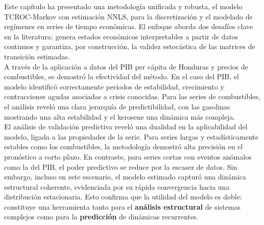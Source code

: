 Este capítulo ha presentado una metodología unificada y robusta, el modelo TCROC-Markov con estimación NNLS, para la discretización y el modelado de regímenes en series de tiempo económicas. El enfoque aborda dos desafíos clave en la literatura: genera estados económicos interpretables a partir de datos continuos y garantiza, por construcción, la validez estocástica de las matrices de transición estimadas.\\

A través de la aplicación a datos del PIB per cápita de Honduras y precios de combustibles, se demostró la efectividad del método. En el caso del PIB, el modelo identificó correctamente períodos de estabilidad, crecimiento y contracciones agudas asociadas a crisis conocidas. Para las series de combustibles, el análisis reveló una clara jerarquía de predictibilidad, con las gasolinas mostrando una alta estabilidad y el kerosene una dinámica más compleja.\\

El análisis de validación predictiva reveló una dualidad en la aplicabilidad del modelo, ligada a las propiedades de la serie. Para series largas y estadísticamente estables como los combustibles, la metodología demostró alta precisión en el pronóstico a corto plazo. En contraste, para series cortas con eventos anómalos como la del PIB, el poder predictivo se reduce por la escasez de datos. Sin embargo, incluso en este escenario, el modelo estimado capturó una dinámica estructural coherente, evidenciada por su rápida convergencia hacia una distribución estacionaria. Esto confirma que la utilidad del modelo es doble: constituye una herramienta tanto para el \textbf{análisis estructural} de sistemas complejos como para la \textbf{predicción} de dinámicas recurrentes.





